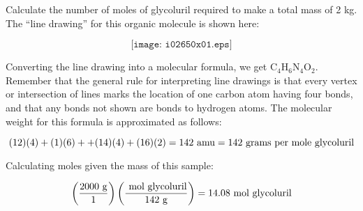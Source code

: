 

Calculate the number of moles of glycoluril required to make a total mass of 2 kg.  The ``line drawing'' for this organic molecule is shown here:

$$\texttt{[image: i02650x01.eps]}$$







Converting the line drawing into a molecular formula, we get C$_{4}$H$_{6}$N$_{4}$O$_{2}$.  Remember that the general rule for interpreting line drawings is that every vertex or intersection of lines marks the location of one carbon atom having four bonds, and that any bonds not shown are bonds to hydrogen atoms.  The molecular weight for this formula is approximated as follows:

$$(12)(4) + (1)(6) + + (14)(4) + (16)(2) = 142 \hbox{ amu} = 142 \hbox{ grams per mole glycoluril}$$

\vskip 10pt

Calculating moles given the mass of this sample:

$$\left(2000 \hbox{ g} \over 1 \right) \left(\hbox{ mol glycoluril} \over 142 \hbox{ g}\right) = 14.08 \hbox{ mol glycoluril}$$











